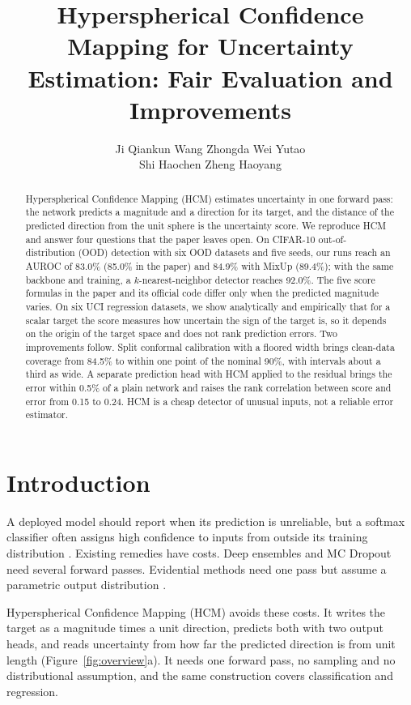 \documentclass[letterpaper]{article} %
\title{Hyperspherical Confidence Mapping for Uncertainty Estimation: Fair Evaluation and Improvements}
\author{
  Ji Qiankun \quad
  Wang Zhongda \quad
  Wei Yutao \\
  Shi Haochen \quad
  Zheng Haoyang
}
\begin{document}
\nocopyright
\maketitle

\begin{abstract}
Hyperspherical Confidence Mapping (HCM) \citep{hcm2026} estimates uncertainty in one forward pass: the network predicts a magnitude and a direction for its target, and the distance of the predicted direction from the unit sphere is the uncertainty score. We reproduce HCM and answer four questions that the paper leaves open. On CIFAR-10 out-of-distribution (OOD) detection with six OOD datasets and five seeds, our runs reach an AUROC of 83.0\% (85.0\% in the paper) and 84.9\% with MixUp (89.4\%); with the same backbone and training, a $k$-nearest-neighbor detector reaches 92.0\%. The five score formulas in the paper and its official code differ only when the predicted magnitude varies. On six UCI regression datasets, we show analytically and empirically that for a scalar target the score measures how uncertain the sign of the target is, so it depends on the origin of the target space and does not rank prediction errors. Two improvements follow. Split conformal calibration with a floored width brings clean-data coverage from 84.5\% to within one point of the nominal 90\%, with intervals about a third as wide. A separate prediction head with HCM applied to the residual brings the error within 0.5\% of a plain network and raises the rank correlation between score and error from 0.15 to 0.24. HCM is a cheap detector of unusual inputs, not a reliable error estimator.
\end{abstract}

\section{Introduction}

A deployed model should report when its prediction is unreliable, but a softmax classifier often assigns high confidence to inputs from outside its training distribution \citep{hendrycks2017baseline}. Existing remedies have costs. Deep ensembles \citep{lakshminarayanan2017simple} and MC Dropout \citep{gal2016dropout} need several forward passes. Evidential methods need one pass but assume a parametric output distribution \citep{sensoy2018evidential,amini2020deep}.

Hyperspherical Confidence Mapping (HCM) \citep{hcm2026} avoids these costs. It writes the target as a magnitude times a unit direction, predicts both with two output heads, and reads uncertainty from how far the predicted direction is from unit length (Figure~\ref{fig:overview}a). It needs one forward pass, no sampling and no distributional assumption, and the same construction covers classification and regression.
\end{document}
